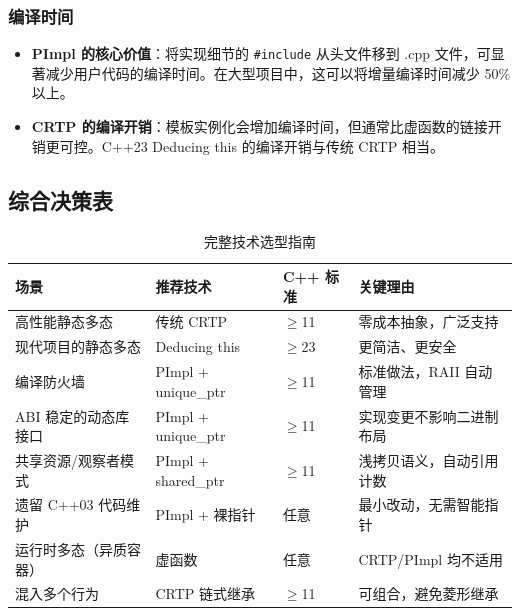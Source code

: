 \documentclass[12pt,a4paper,fontset=fandol]{ctexbook}
\begin{document}
\subsubsection{编译时间}

\begin{itemize}[leftmargin=2em]
  \item \textbf{PImpl 的核心价值}：将实现细节的 \texttt{\#include} 从头文件移到 .cpp 文件，可显著减少用户代码的编译时间。在大型项目中，这可以将增量编译时间减少 50\% 以上。
  \item \textbf{CRTP 的编译开销}：模板实例化会增加编译时间，但通常比虚函数的链接开销更可控。C++23 Deducing this 的编译开销与传统 CRTP 相当。
\end{itemize}

\subsection{综合决策表}

\begin{table}[ht]
\centering
\caption{完整技术选型指南}
\label{tab:full-decision}
\begin{tabular}{@{}>{\raggedright\arraybackslash}p{4.2cm}>{\raggedright\arraybackslash}p{4cm}>{\raggedright\arraybackslash}p{1.5cm}>{\raggedright\arraybackslash}p{4.5cm}@{}}
\toprule
\textbf{场景} & \textbf{推荐技术} & \textbf{C++ 标准} & \textbf{关键理由} \\
\midrule
高性能静态多态         & 传统 CRTP           & $\geq$11  & 零成本抽象，广泛支持 \\
现代项目的静态多态     & Deducing this       & $\geq$23  & 更简洁、更安全 \\
编译防火墙             & PImpl + unique\_ptr & $\geq$11  & 标准做法，RAII 自动管理 \\
ABI 稳定的动态库接口   & PImpl + unique\_ptr & $\geq$11  & 实现变更不影响二进制布局 \\
共享资源/观察者模式    & PImpl + shared\_ptr & $\geq$11  & 浅拷贝语义，自动引用计数 \\
遗留 C++03 代码维护    & PImpl + 裸指针      & 任意      & 最小改动，无需智能指针 \\
运行时多态（异质容器） & 虚函数              & 任意      & CRTP/PImpl 均不适用 \\
混入多个行为           & CRTP 链式继承       & $\geq$11  & 可组合，避免菱形继承 \\
\bottomrule
\end{tabular}
\end{table}
\end{document}
